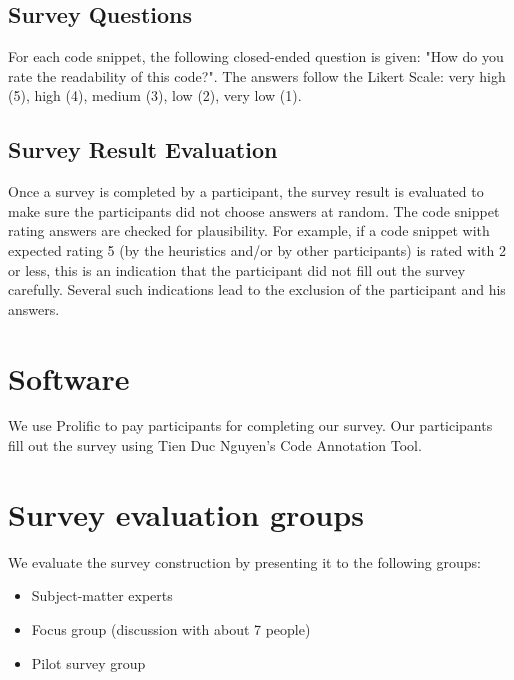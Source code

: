 \documentclass[%
class=scrreprt,
chapterprefix=false,%
open=right,%
twoside=false,%
paper=a4,%
logofile={Logo\_zentral\_farbig\_EN.png},%
thesistype=masterproposal,%
UKenglish,%
]{se2thesis}
\begin{document}
	


\subsection{Survey Questions} %
For each code snippet, the following closed-ended question is given: "How do you rate the readability of this code?". The answers follow the Likert Scale: very high (5), high (4), medium (3), low (2), very low (1).

\subsection{Survey Result Evaluation}
Once a survey is completed by a participant, the survey result is evaluated to make sure the participants did not choose answers at random. The code snippet rating answers are checked for plausibility. For example, if a code snippet with expected rating 5 (by the heuristics and/or by other participants) is rated with 2 or less, this is an indication that the participant did not fill out the survey carefully. Several such indications lead to the exclusion of the participant and his answers.

\section{Software}
We use Prolific to pay participants for completing our survey. Our participants fill out the survey using Tien Duc Nguyen's Code Annotation Tool.

\section{Survey evaluation groups} \label{sec:survey-evaluation}
We evaluate the survey construction by presenting it to the following groups:
\begin{itemize}
	\item Subject-matter experts
	\item Focus group (discussion with about 7 people)
	\item Pilot survey group
\end{itemize}
\end{document}
